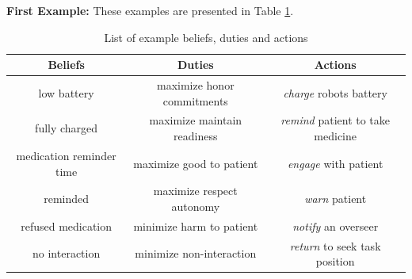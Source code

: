 \textbf{First Example:}
These examples are presented in Table \ref{example_list}. 
\renewcommand*{\arraystretch}{1.3}
{\footnotesize
\begin{longtable}{ccc}
\caption{List of example beliefs, duties and actions}
			\label{example_list} 
			\cr
			\toprule 
			\centering 
{\centering\textbf{Beliefs}} & 
{\centering\textbf{Duties}} & {\centering\textbf{Actions}} \\ \toprule
\endhead
{\parbox{4cm}{low battery}}  & {\parbox{5cm}{maximize honor commitments}}  & {\parbox{5cm}{\emph{charge} robots battery}}  \\  %

{\parbox{4cm}{fully charged}}  & {\parbox{5cm}{maximize maintain readiness}}  & {\parbox{5cm}{\emph{remind} patient to take medicine}}  \\  %

{\parbox{4cm}{medication reminder time}}  & {\parbox{5cm}{maximize good to patient}}  & {\parbox{5cm}{\emph{engage} with patient}}  \\  %

{\parbox{4cm}{reminded}}  & {\parbox{5cm}{maximize respect autonomy}}  & {\parbox{5cm}{\emph{warn} patient }}  \\  %

{\parbox{4cm}{refused medication}}  & {\parbox{5cm}{minimize harm to patient}}  & {\parbox{5cm}{\emph{notify} an overseer}}  \\  %

{\parbox{4cm}{no interaction}}  & {\parbox{5cm}{minimize non-interaction}}  & {\parbox{5cm}{\emph{return} to seek task position}}  \\  %
\bottomrule
\end{longtable}
} 



